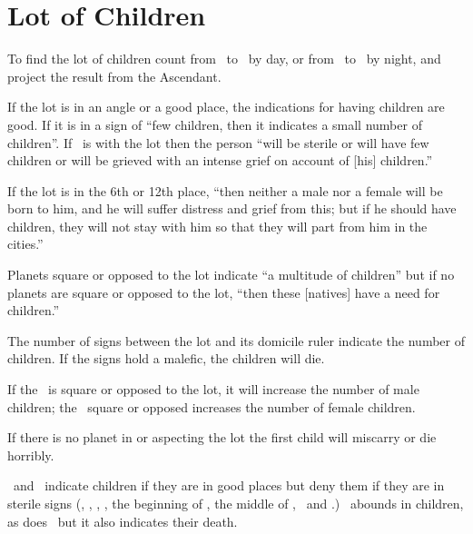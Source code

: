 \section{Lot of Children}
To find the lot of children count from \Jupiter\, to \Saturn\, by day, or from \Saturn\, to \Jupiter\, by night, and project the result from the Ascendant. 

If the lot is in an angle or a good place, the indications for having children are good. If it is in a sign of ``few children, then it indicates a small number of children''. If \Saturn\, is with the lot then the person ``will be sterile or will have few children or will be grieved with an intense grief on account of [his] children.''

If the lot is in the 6th or 12th place, ``then neither a male nor a female will be born to him, and he will suffer distress and grief from this; but if he should have children, they will not stay with him so that they will part from him in the cities.''

Planets square or opposed to the lot indicate ``a multitude of children'' but if no planets are square or opposed to the lot, ``then these [natives] have a need for children.''

The number of signs between the lot and its domicile ruler indicate the number of children. If the signs hold a malefic, the children will die.

If the \Sun\, is square or opposed to the lot, it will increase the number of male children; the \Moon\, square or opposed increases the number of female children.

If there is no planet in or aspecting the lot the first child will miscarry or die horribly.

\Jupiter\, and \Mercury\, indicate children if they are in good places but deny them if they are in sterile signs (\Gemini, \Leo, \Virgo, \Capricorn, the beginning of \Taurus, the middle of \Libra, \Aries\, and \Sagittarius.) \Aquarius\, abounds in children, as does \Scorpio\, but it also indicates their death.

